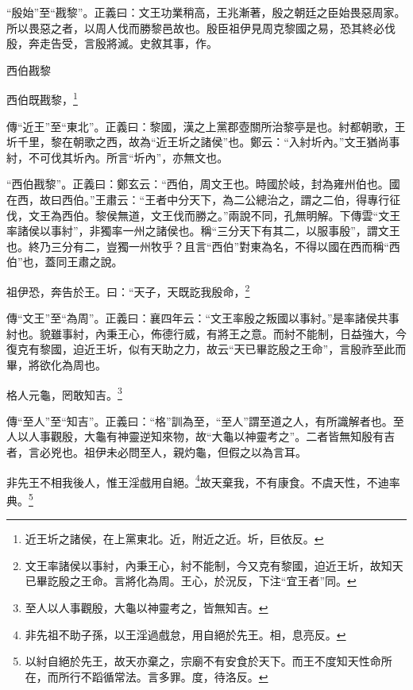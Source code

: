 {\noindent\shu{}\fzkt “殷始”至“戡黎”。正義曰：文王功業稍高，王兆漸著，殷之朝廷之臣始畏惡周家。所以畏惡之者，以周人伐而勝黎邑故也。殷臣祖伊見周克黎國之易，恐其終必伐殷，奔走告受，言殷將滅。史敘其事，作。 \par}

西伯戡黎

西伯既戡黎，\footnote{近王圻之諸侯，在上黨東北。近，附近之近。圻，巨依反。}


{\noindent\zhuan{}\fzbyks 傳“近王”至“東北”。正義曰：黎國，漢之上黨郡壺關所治黎亭是也。紂都朝歌，王圻千里，黎在朝歌之西，故為“近王圻之諸侯”也。鄭云：“入紂圻內。”文王猶尚事紂，不可伐其圻內。所言“圻內”，亦無文也。 \par}

{\noindent\shu{}\fzkt “西伯戡黎”。正義曰：鄭玄云：“西伯，周文王也。時國於岐，封為雍州伯也。國在西，故曰西伯。”王肅云：“王者中分天下，為二公總治之，謂之二伯，得專行征伐，文王為西伯。黎侯無道，文王伐而勝之。”兩說不同，孔無明解。下傳雲“文王率諸侯以事紂”，非獨率一州之諸侯也。稱“三分天下有其二，以服事殷”，謂文王也。終乃三分有二，豈獨一州牧乎？且言“西伯”對東為名，不得以國在西而稱“西伯”也，蓋同王肅之說。 \par}

祖伊恐，奔告於王。曰：“天子，天既訖我殷命，\footnote{文王率諸侯以事紂，內秉王心，紂不能制，今又克有黎國，迫近王圻，故知天已畢訖殷之王命。言將化為周。王心，於況反，下注“宜王者”同。}

{\noindent\zhuan{}\fzbyks 傳“文王”至“為周”。正義曰：襄四年云：“文王率殷之叛國以事紂。”是率諸侯共事紂也。貌雖事紂，內秉王心，佈德行威，有將王之意。而紂不能制，日益強大，今復克有黎國，迫近王圻，似有天助之力，故云“天已畢訖殷之王命”，言殷祚至此而畢，將欲化為周也。 \par}

格人元龜，罔敢知吉。\footnote{至人以人事觀殷，大龜以神靈考之，皆無知吉。}

{\noindent\zhuan{}\fzbyks 傳“至人”至“知吉”。正義曰：“格”訓為至，“至人”謂至道之人，有所識解者也。至人以人事觀殷，大龜有神靈逆知來物，故“大龜以神靈考之”。二者皆無知殷有吉者，言必兇也。祖伊未必問至人，親灼龜，但假之以為言耳。 \par}

非先王不相我後人，惟王淫戲用自絕。\footnote{非先祖不助子孫，以王淫過戲怠，用自絕於先王。相，息亮反。}故天棄我，不有康食。不虞天性，不迪率典。\footnote{以紂自絕於先王，故天亦棄之，宗廟不有安食於天下。而王不度知天性命所在，而所行不蹈循常法。言多罪。度，待洛反。}


